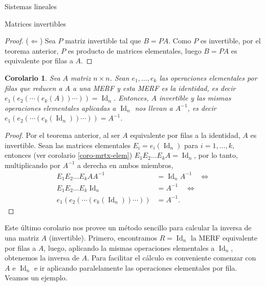 \documentclass[a4paper,12pt,twoside,spanish,reqno]{amsbook}
\newtheorem{corolario}[teorema]{Corolario}
\theoremstyle{definition}
\theoremstyle{remark}
\newcommand{\Id}{\operatorname{Id}}
\begin{document}
\begin{chapter}{Sistemas lineales}
\begin{section}{Matrices invertibles}
\begin{proof}
                ($\Leftarrow$) Sea  $P$  matriz invertible tal que $B =PA$. Como $P$ es invertible, por el teorema anterior, $P$ es producto de matrices elementales, luego $B =PA$ es equivalente por filas a $A$.
            \end{proof}	
            
            \begin{corolario}\label{mtrx-inv-gauss}
                Sea $A$ matriz $n \times n$. Sean $e_1,\ldots,e_k$ las operaciones elementales por filas que reducen a $A$  a una MERF y esta MERF es la identidad,  es decir $e_1(e_{2}(\cdots(e_k(A))\cdots)) =\Id_n$. Entonces, $A$ invertible y  las mismas operaciones elementales aplicadas a $\Id_n$ nos llevan a $A^{-1}$,  es decir $e_1(e_{2}(\cdots(e_k(\Id_n))\cdots)) =A^{-1}$.
            \end{corolario}
            \begin{proof} Por el teorema anterior, al ser $A$ equivalente por filas a la identidad, $A$ es invertible.  
                Sean las matrices elementales  $E_i = e_i(\Id_n)$ para $i=1,\ldots,k$,  entonces (ver corolario \ref{coro-mrtx-elem}) $E_1E_2\ldots E_kA = \Id_n$, por lo tanto, multiplicando por $A^{-1}$ a derecha en ambos miembros,    
                \begin{align*}
                E_1E_2\ldots E_kA A^{-1}&= \Id_nA^{-1} \quad \Leftrightarrow \\
                E_1E_2\ldots E_k\Id_n&= A^{-1} \quad \Leftrightarrow \\
                e_1(e_{2}(\cdots(e_k(\Id_n))\cdots)) &=A^{-1}.
                \end{align*}
            \end{proof}
            
            Este último corolario nos provee un método sencillo para calcular la inversa de una matriz $A$ (invertible). Primero,  encontramos $R = \Id_n$ la MERF  equivalente por filas a $A$, luego, aplicando la mismas operaciones elementales a $\Id_n$, obtenemos la inversa de $A$. Para facilitar el cálculo es  conveniente comenzar con $A$ e $\Id_n$ e ir aplicando paralelamente las operaciones elementales por fila. Veamos un ejemplo.


\end{section}
\end{chapter}
\end{document}
